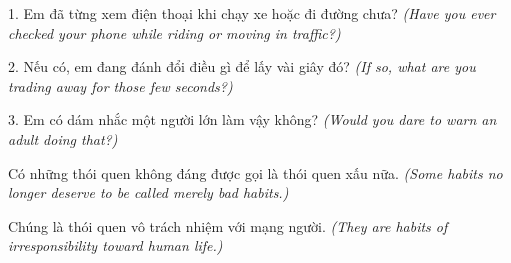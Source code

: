 \begin{tuhocnhanh}
1. Em đã từng xem điện thoại khi chạy xe hoặc đi đường chưa? \textit{(Have you ever checked your phone while riding or moving in traffic?)}

2. Nếu có, em đang đánh đổi điều gì để lấy vài giây đó? \textit{(If so, what are you trading away for those few seconds?)}

3. Em có dám nhắc một người lớn làm vậy không? \textit{(Would you dare to warn an adult doing that?)}
\end{tuhocnhanh}

\begin{tongketchuong}
Có những thói quen không đáng được gọi là thói quen xấu nữa.
\textit{(Some habits no longer deserve to be called merely bad habits.)}

Chúng là thói quen vô trách nhiệm với mạng người.
\textit{(They are habits of irresponsibility toward human life.)}
\end{tongketchuong}

\ngancach